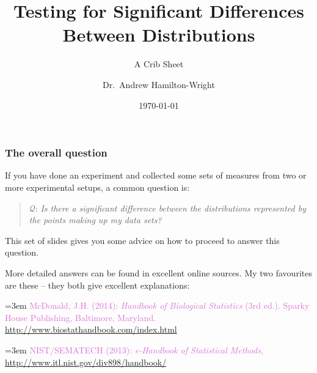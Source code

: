 \documentclass{beamer}
\title{Testing for Significant Differences Between Distributions}
\subtitle{A Crib Sheet}
\author{Dr.~Andrew Hamilton-Wright}
\institute{School of Computer Science\\
University of Guelph}
\date{\today}
\newcommand{\kq}[1]{\textcolor{burntumber}{$\mathcal{Q}$: \emph{#1}}}
\begin{document}


\begin{frame}
    \titlepage
\end{frame}


\begin{frame}
\frametitle{The overall question}
If you have done an experiment and collected some sets of
measures from two or more experimental setups, a common
question is:
\begin{quote}
\kq{Is there a significant difference between the distributions represented by the points making up my data sets?}
\end{quote}

This set of slides gives you some advice on how to proceed to answer
this question.

More detailed answers can be found in excellent online sources.  My
two favourites are these -- they both give excellent explanations:

\hangindent=3em
\textcolor{orchid}{McDonald, J.H. (2014): \emph{Handbook of Biological Statistics} (3rd ed.).
		Sparky House Publishing, Baltimore, Maryland.
		\url{http://www.biostathandbook.com/index.html}}

\hangindent=3em
\textcolor{orchid}{NIST/SEMATECH (2013): \emph{e-Handbook of Statistical Methods}, \url{http://www.itl.nist.gov/div898/handbook/}}
\end{frame}
\end{document}
